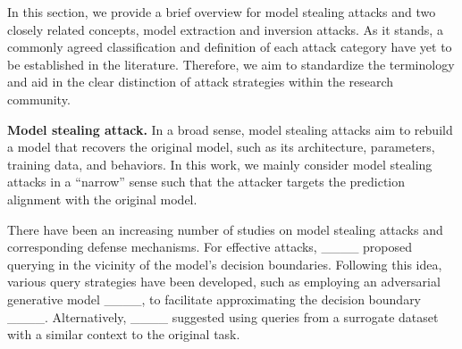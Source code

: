 

    In this section, we provide a brief overview for model stealing attacks and two closely related concepts, model extraction and inversion attacks. As it stands, a commonly agreed classification and definition of each attack category have yet to be established in the literature. Therefore, we aim to standardize the terminology and aid in the clear distinction of attack strategies within the research community.

    \textbf{Model stealing attack.} In a broad sense, model stealing attacks aim to rebuild a model that recovers the original model, such as its architecture, parameters, training data, and behaviors. In this work, we mainly consider model stealing attacks in a ``narrow'' sense such that the attacker targets the prediction alignment with the original model.
    
    There have been an increasing number of studies on model stealing attacks and corresponding defense mechanisms. 
    For effective attacks, ____ proposed querying in the vicinity of the model's decision boundaries. Following this idea, various query strategies have been developed, such as employing an adversarial generative model ____, to facilitate approximating the decision boundary ____. 
    Alternatively, ____ suggested using queries from a surrogate dataset with a similar context to the original task. 

